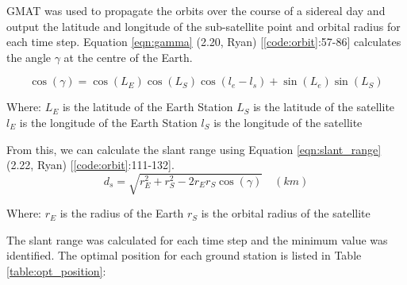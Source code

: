\documentclass[12pt]{article}
\begin{document}
GMAT was used to propagate the orbits over the course of a sidereal day and output the latitude and longitude of the sub-satellite point and orbital radius for each time step. Equation \ref{eqn:gamma} (2.20, Ryan) [\ref{code:orbit}:57-86] calculates the angle $\gamma$ at the centre of the Earth. 

\begin{equation}
    \cos (\gamma) = \cos(L_E)\cos(L_S)\cos(l_e - l_s) + \sin(L_e)\sin(L_S)
    \label{eqn:gamma}
\end{equation}

Where: \newline
\quad $L_E$ is the latitude of the Earth Station \newline
\quad $L_S$ is the latitude of the satellite \newline
\quad $l_E$ is the longitude of the Earth Station \newline
\quad $l_S$ is the longitude of the satellite \newline

From this, we can calculate the slant range using Equation \ref{eqn:slant_range} (2.22, Ryan) [\ref{code:orbit}:111-132].
\begin{equation}
    d_s = \sqrt{r_E^2 + r_S^2 - 2 r_E r_S \cos(\gamma)} \quad (km)
    \label{eqn:slant_range}
\end{equation}

Where: \newline
\quad $r_E$ is the radius of the Earth \newline
\quad $r_S$ is the orbital radius of the satellite \newline

The slant range was calculated for each time step and the minimum value was identified. The optimal position for each ground station is  listed in Table \ref{table:opt_position}:
\end{document}
